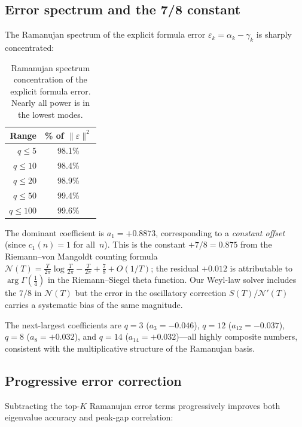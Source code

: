 \documentclass[11pt,a4paper]{article}
\begin{document}
\subsection{Error spectrum and the 7/8 constant}

The Ramanujan spectrum of the explicit formula error $\varepsilon_k = \alpha_k - \gamma_k$ is sharply concentrated:

\begin{table}[ht]
\centering
\begin{tabular}{@{}rc@{}}
\toprule
Range & \% of $\|\varepsilon\|^2$ \\
\midrule
$q \le 5$ & 98.1\% \\
$q \le 10$ & 98.4\% \\
$q \le 20$ & 98.9\% \\
$q \le 50$ & 99.4\% \\
$q \le 100$ & 99.6\% \\
\bottomrule
\end{tabular}
\caption{Ramanujan spectrum concentration of the explicit formula error. Nearly all power is in the lowest modes.}
\label{tab:ramspec}
\end{table}

The dominant coefficient is $a_1 = +0.8873$, corresponding to a \emph{constant offset} (since $c_1(n) = 1$ for all~$n$).
This is the constant $+7/8 = 0.875$ from the Riemann--von Mangoldt counting formula $\mathcal{N}(T) = \frac{T}{2\pi}\log\frac{T}{2\pi} - \frac{T}{2\pi} + \frac{7}{8} + O(1/T)$; the residual $+0.012$ is attributable to $\arg\Gamma(\tfrac{1}{4})$ in the Riemann--Siegel theta function.
Our Weyl-law solver includes the $7/8$ in $\mathcal{N}(T)$ but the error in the oscillatory correction $S(T)/\mathcal{N}'(T)$ carries a systematic bias of the same magnitude.

The next-largest coefficients are $q = 3$ ($a_3 = -0.046$), $q = 12$ ($a_{12} = -0.037$), $q = 8$ ($a_8 = +0.032$), and $q = 14$ ($a_{14} = +0.032$)---all highly composite numbers, consistent with the multiplicative structure of the Ramanujan basis.

\subsection{Progressive error correction}

Subtracting the top-$K$ Ramanujan error terms progressively improves both eigenvalue accuracy and peak-gap correlation:
\end{document}
